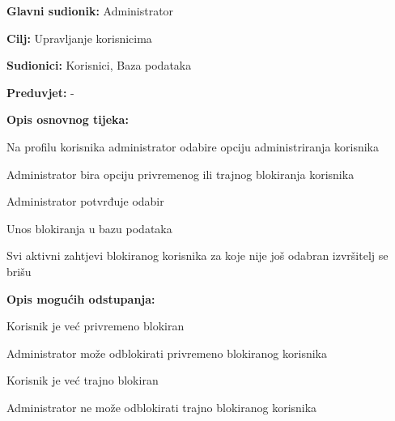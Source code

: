 				
					\noindent {}
					\begin{packed_item}
						
						\item \textbf{Glavni sudionik: }Administrator
						\item  \textbf{Cilj:} Upravljanje korisnicima 
						\item  \textbf{Sudionici:} Korisnici, Baza podataka
						\item  \textbf{Preduvjet:} -
						\item  \textbf{Opis osnovnog tijeka:}
						
						\item[] \begin{packed_enum}
							
							\item Na profilu korisnika administrator odabire opciju administriranja korisnika
							\item Administrator bira opciju privremenog ili trajnog blokiranja korisnika
							\item Administrator potvrđuje odabir
							\item Unos blokiranja u bazu podataka
							\item Svi aktivni zahtjevi blokiranog korisnika za koje nije još odabran izvršitelj se brišu
						\end{packed_enum}
					
						\item  \textbf{Opis mogućih odstupanja:}
						
						\item[] \begin{packed_item}
							
							\item[1.a] Korisnik je već privremeno blokiran
							\item[] \begin{packed_enum}
								
								\item Administrator može odblokirati privremeno blokiranog korisnika
								
							\end{packed_enum}
						  
							\item[1.b] Korisnik je već trajno blokiran
							\item[] \begin{packed_enum}
								
								\item Administrator ne može odblokirati trajno blokiranog korisnika
								
							\end{packed_enum}
					
					
						
					\end{packed_item}
				\end{packed_item}
				
